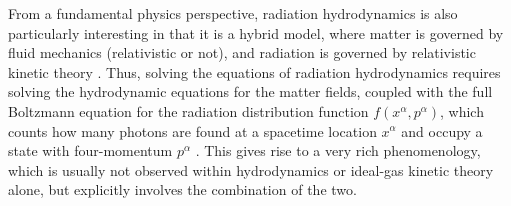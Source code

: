 \documentclass[a4paper, amsfonts, amssymb, amsmath, reprint, showkeys, nofootinbib, twoside,notitlepage,onecolumn]{revtex4-2}
\theoremstyle{definition}
\theoremstyle{theorem}
\theoremstyle{corollary}
\begin{document}
From a fundamental physics perspective, radiation hydrodynamics is also particularly interesting in that it is a hybrid model, where matter is governed by fluid mechanics (relativistic or not), and radiation is governed by relativistic kinetic theory \cite{Groot1980RelativisticKT}. Thus, solving the equations of radiation hydrodynamics requires solving the hydrodynamic equations for the matter fields, coupled with the full Boltzmann equation for the radiation distribution function $f(x^\alpha,p^\alpha)$, which counts how many photons are found at a spacetime location $x^\alpha$ and occupy a state with four-momentum $p^\alpha$ \cite[\S 22.6]{MTW_book}. This gives rise to a very rich phenomenology, which is usually not observed within hydrodynamics or ideal-gas kinetic theory alone, but explicitly involves the combination of the two. 

\end{document}
